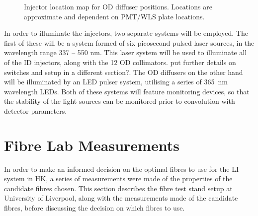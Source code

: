 \documentclass[a4paper,11pt]{article}
\begin{document}
\begin{figure}[h!]
\centering
{}
\caption{Injector location map for OD diffuser positions. Locations are approximate and dependent on PMT/WLS plate locations.}\label{fig:ODdiffmap}
\end{figure}

In order to illuminate the injectors, two separate systems will be employed. The first of these will be a system formed of six picosecond pulsed laser sources, in the wavelength range 337 -- 550 nm. This laser system will be used to illuminate all of the ID injectors, along with the 12 OD collimators. {\color{red} put further details on switches and setup in a different section?}. The OD diffusers on the other hand will be illuminated by an LED pulser system, utilising a series of 365~nm wavelength LEDs. Both of these systems will feature monitoring devices, so that the stability of the light sources can be monitored prior to convolution with detector parameters.


\section{Fibre Lab Measurements}

In order to make an informed decision on the optimal fibres to use for the LI system in HK, a series of measurements were made of the properties of the candidate fibres chosen. This section describes the fibre test stand setup at University of Liverpool, along with the measurements made of the candidate fibres, before discussing the decision on which fibres to use.
\end{document}
